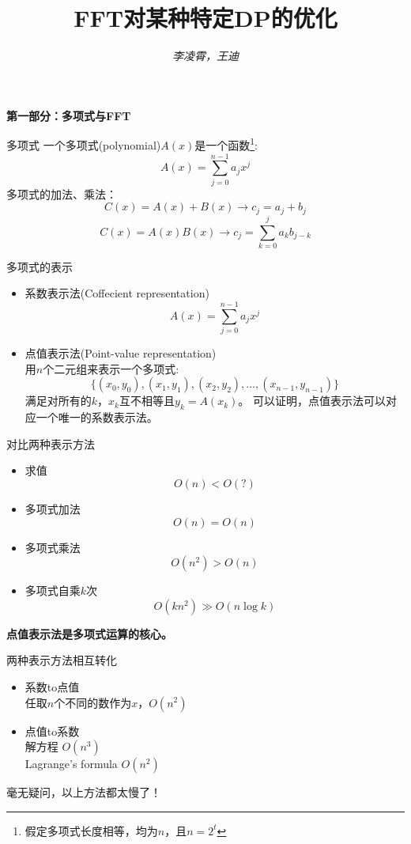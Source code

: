 \documentclass[allowframebreaks,10pt]{beamer}
\title[FFT对某种特定DP的优化]{FFT对某种特定DP的优化}
\author[csimstu,zcwwzdjn]{\small\itshape{李凌霄，王迪}}
\institute[CDQZ]{
	{\small\itshape 成都七中} \\[0.5ex]
		\texttt{csimstu@gmail.com, zcwwzdjn@hotmail.com}
}
\begin{document}
\begin{frame}[plain]
\titlepage
\end{frame}

\begin{frame}[plain]
\begin{center}
\textbf{第一部分：多项式与FFT}
\end{center}
\end{frame}

\begin{frame}{多项式}
一个多项式(polynomial)$A(x)$是一个函数\footnote{假定多项式长度相等，均为$n$，且$n=2^t$}:
\[
A(x) = \sum_{j=0}^{n-1}a_j x^{j}
\]
\pause
多项式的加法、乘法：
\[
C(x) = A(x) + B(x) \to c_j = a_j + b_j 
\]
\[
C(x) = A(x)B(x) \to c_j = \sum_{k=0}^{j} a_k b_{j-k}
\]
\end{frame}

\begin{frame}{多项式的表示}
\begin{itemize}
\pause
\item 系数表示法(Coffecient representation)
\[
A(x) = \sum_{j=0}^{n-1}a_j x^{j}
\]
\pause
\item 点值表示法(Point-value representation)
	\\ 用$n$个二元组来表示一个多项式:
	\[
	\{ (x_0, y_0), (x_1, y_1), (x_2, y_2), \ldots, (x_{n-1}, y_{n-1})\}
	\]
	满足对所有的$k$，$x_k$互不相等且$y_k = A(x_k)$。
	\pause
	可以证明，点值表示法可以对应一个唯一的系数表示法。
\end{itemize}

\end{frame}

\begin{frame}{对比两种表示方法}
\begin{itemize}
\pause
\item 求值
	\[ O(n) < O(?)\]
\pause
\item 多项式加法
	\[O(n) = O(n)\]
\pause
\item 多项式乘法
	\[ O(n^2) > O(n) \]
\pause
\item 多项式自乘$k$次
	\[ O(kn^2) \gg O(n \log k) \]
\end{itemize}
\pause
\textbf{点值表示法是多项式运算的核心。}
\end{frame}

\begin{frame}{两种表示方法相互转化}
\begin{itemize}
\pause
\item 系数to点值 
\pause
	\\[1ex] 任取$n$个不同的数作为${x}$，$O(n^2)$
\pause
\item 点值to系数
\pause
	\\[1ex] 解方程 $O(n^3)$
\pause
	\\ Lagrange’s formula $O(n^2)$
\end{itemize}
\pause
毫无疑问，以上方法都太慢了！
\end{frame}
\end{document}
